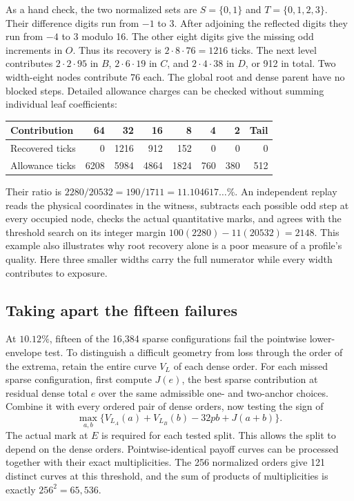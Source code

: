 As a hand check, the two normalized sets are \(S=\{0,1\}\) and \(T=\{0,1,2,3\}\). Their difference digits run from \(-1\) to 3. After adjoining the reflected digits they run from \(-4\) to 3 modulo 16. The other eight digits give the missing odd increments in \(O\). Thus its recovery is \(2\cdot8\cdot76=1216\) ticks. The next level contributes \(2\cdot2\cdot95\) in \(B\), \(2\cdot6\cdot19\) in \(C\), and \(2\cdot4\cdot38\) in \(D\), or 912 in total. Two width-eight nodes contribute 76 each. The global root and dense parent have no blocked steps. Detailed allowance charges can be checked without summing individual leaf coefficients:
\begin{center}
\begin{tabular}{@{}lrrrrrrr@{}}
\toprule
Contribution & 64 & 32 & 16 & 8 & 4 & 2 & Tail\\
\midrule
Recovered ticks & 0 & 1216 & 912 & 152 & 0 & 0 & 0\\
Allowance ticks & 6208 & 5984 & 4864 & 1824 & 760 & 380 & 512\\
\bottomrule
\end{tabular}
\end{center}
Their ratio is \(2280/20532=190/1711=11.104617\ldots\%\). An independent replay reads the physical coordinates in the witness, subtracts each possible odd step at every occupied node, checks the actual quantitative marks, and agrees with the threshold search on its integer margin \(100(2280)-11(20532)=2148\). This example also illustrates why root recovery alone is a poor measure of a profile's quality. Here three smaller widths carry the full numerator while every width contributes to exposure.

\subsection{Taking apart the fifteen failures}

At \(10.12\%\), fifteen of the 16,384 sparse configurations fail the pointwise lower-envelope test. To distinguish a difficult geometry from loss through the order of the extrema, retain the entire curve \(V_L\) of each dense order. For each missed sparse configuration, first compute \(J(e)\), the best sparse contribution at residual dense total \(e\) over the same admissible one- and two-anchor choices. Combine it with every ordered pair of dense orders, now testing the sign of
\[
 \max_{a,b}\{V_{L_A}(a)+V_{L_B}(b)-32pb+J(a+b)\}.
\]
The actual mark at \(E\) is required for each tested split. This allows the split to depend on the dense orders. Pointwise-identical payoff curves can be processed together with their exact multiplicities. The 256 normalized orders give 121 distinct curves at this threshold, and the sum of products of multiplicities is exactly \(256^2=65{,}536\).

